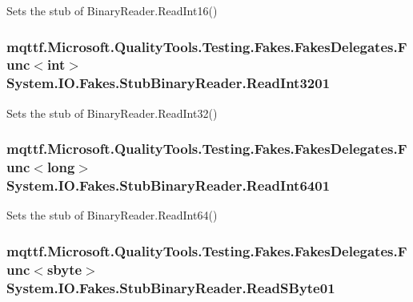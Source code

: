Sets the stub of Binary\-Reader.\-Read\-Int16()

\hypertarget{class_system_1_1_i_o_1_1_fakes_1_1_stub_binary_reader_a359899dc55cbdba201b085d93698b2ac}{
\subsubsection[{Read\-Int3201}]{\setlength{\rightskip}{0pt plus 5cm}mqttf.\-Microsoft.\-Quality\-Tools.\-Testing.\-Fakes.\-Fakes\-Delegates.\-Func$<$int$>$ System.\-I\-O.\-Fakes.\-Stub\-Binary\-Reader.\-Read\-Int3201}}\label{class_system_1_1_i_o_1_1_fakes_1_1_stub_binary_reader_a359899dc55cbdba201b085d93698b2ac}


Sets the stub of Binary\-Reader.\-Read\-Int32()

\hypertarget{class_system_1_1_i_o_1_1_fakes_1_1_stub_binary_reader_ae25500a0900642ac759b76bc75e7ce7b}{
\subsubsection[{Read\-Int6401}]{\setlength{\rightskip}{0pt plus 5cm}mqttf.\-Microsoft.\-Quality\-Tools.\-Testing.\-Fakes.\-Fakes\-Delegates.\-Func$<$long$>$ System.\-I\-O.\-Fakes.\-Stub\-Binary\-Reader.\-Read\-Int6401}}\label{class_system_1_1_i_o_1_1_fakes_1_1_stub_binary_reader_ae25500a0900642ac759b76bc75e7ce7b}


Sets the stub of Binary\-Reader.\-Read\-Int64()

\hypertarget{class_system_1_1_i_o_1_1_fakes_1_1_stub_binary_reader_a679debed6101eae1fdc501f1d38d77cb}{
\subsubsection[{Read\-S\-Byte01}]{\setlength{\rightskip}{0pt plus 5cm}mqttf.\-Microsoft.\-Quality\-Tools.\-Testing.\-Fakes.\-Fakes\-Delegates.\-Func$<$sbyte$>$ System.\-I\-O.\-Fakes.\-Stub\-Binary\-Reader.\-Read\-S\-Byte01}}\label{class_system_1_1_i_o_1_1_fakes_1_1_stub_binary_reader_a679debed6101eae1fdc501f1d38d77cb}


